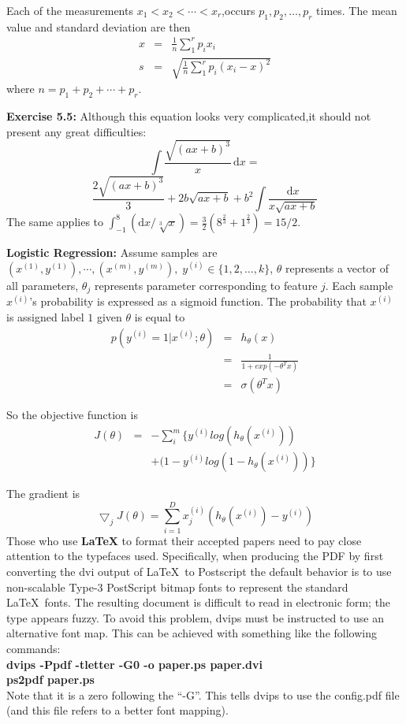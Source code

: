 \documentclass{article}
\begin{document}
Each of the measurements $x_1<x_2<\cdots<x_r$,occurs $p_1,p_2,\ldots,p_r$ times. The
mean value and standard deviation are then
\begin{eqnarray*}
    x&=&\frac{1}{n}\sum_1^r p_ix_i \\ \nonumber
    s&=&\sqrt{\frac{1}{n}\sum_1^r p_i(x_i-x)^2} \nonumber
\end{eqnarray*}
where $n=p_1+p_2+\cdots+p_r$.

{\bf Exercise 5.5:} Although this equation looks very complicated,it should not
present any great difficulties:
\[\int\frac{\sqrt{(ax+b)^3}}{x}\,\mathrm{d}x=\]
\[\frac{2\sqrt{(ax+b)^3}}{3}+2b\sqrt{ax+b}+b^2 \int\frac{\mathrm{d}x}{x\sqrt{ax+b}}\]
The same applies to $\int_{-1}^8(\mathrm{d}x/\sqrt[3]{x})=\frac{3}{2}(8^\frac{2}{3}+1^\frac{2}{3})=15/2$.

{\bf Logistic Regression:} Assume samples are $(x^{(1)},y^{(1)}),\cdots,(x^{(m)},y^{(m)}),\;y^{(i)}\in\{1,2,\ldots,k\}$, $\theta$ represents a vector of all parameters, $\theta_j$ represents parameter corresponding to feature $j$.
Each sample $x^{(i)}$'s probability is expressed as a sigmoid function. The probability that $x^{(i)}$ is assigned label $1$ given $\theta$ is equal to
\begin{eqnarray}
p(y^{(i)}=1|x^{(i)};\theta)&=&h_{\theta}(x)\\\nonumber
         &=&\frac{1}{1+exp(-{\theta}^Tx)}\\\nonumber
         &=&\sigma({\theta}^Tx)\nonumber
\end{eqnarray}

So the objective function is
\begin{eqnarray}
J(\theta)&=&-\sum_i^m \{ y^{(i)}log(h_{\theta}(x^{(i)}))\\\nonumber
         &&+(1-y^{(i)}log(1-h_{\theta}(x^{(i)}))\}\nonumber
\end{eqnarray}

The gradient is
\begin{equation}
\bigtriangledown_jJ(\theta)=\sum_{i=1}^Dx_j^{(i)}(h_{\theta}(x^{(i)})-y^{(i)})
\end{equation}
Those who use \textbf{\LaTeX} to format their accepted papers need to
pay close attention to the typefaces used.  Specifically, when
producing the PDF by first converting the dvi output of \LaTeX\ to Postscript
the default behavior is to use non-scalable Type-3 PostScript bitmap
fonts to represent the standard \LaTeX\ fonts. The resulting document
is difficult to read in electronic form; the type appears fuzzy. To
avoid this problem, dvips must be instructed to use an alternative
font map.  This can be achieved with
something like the following commands:\\[0.5em]
{\bf dvips -Ppdf -tletter -G0 -o paper.ps paper.dvi}\\
{\bf ps2pdf paper.ps}\\[0.5em]
Note that it is a zero following the ``-G''.  This tells dvips to use
the config.pdf file (and this file refers to a better font mapping).
\end{document}
